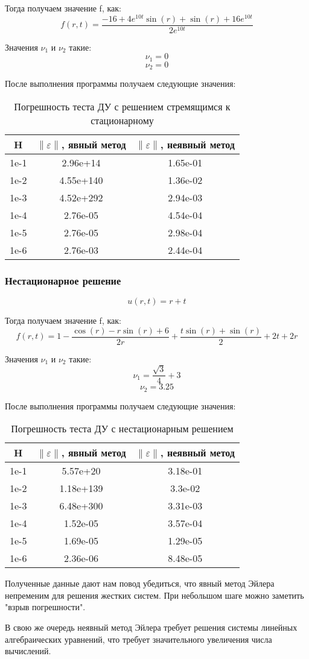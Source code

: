 Тогда получаем значение f, как:
\[
  f(r, t) = \frac{-16 + 4e^{10t}\sin(r) + \sin(r) + 16e^{10t}}{2e^{10t}}
\]

Значения $ \nu_1 $ и $ \nu_2 $ такие:
\[
  \nu_1 = 0
\]
\[
  \nu_2 = 0
\]

После выполнения программы получаем следующие значения:
\begin{table}[H]
  \centering
  \begin{tabular}{c | c | c}
    \toprule
    H & $ \left\lVert \varepsilon \right\rVert  $, явный метод & $ \left\lVert \varepsilon \right\rVert  $, неявный метод \\
    \midrule
    1e-1 & 2.96e+14 & 1.65e-01\\
    1e-2 & 4.55e+140 & 1.36e-02\\
    1e-3 & 4.52e+292 & 2.94e-03\\
    1e-4 & 2.76e-05 & 4.54e-04\\
    1e-5 & 2.76e-05 & 2.98e-04\\
    1e-6 & 2.76e-03 & 2.44e-04\\
    \bottomrule
  \end{tabular}
  \caption{Погрешность теста ДУ с решением стремящимся к стационарному}
\end{table}

\subsubsection{Нестационарное решение}
\[
  u(r, t) = r + t
\]

Тогда получаем значение f, как:
\[
  f(r, t) = 1 - \frac{\cos(r) - r\sin(r) + 6}{2r} + \frac{t\sin(r)+\sin(r)}{2} + 2t + 2r
\]

Значения $ \nu_1 $ и $ \nu_2 $ такие:
\[
  \nu_1 = \frac{\sqrt{3}}{4} + 3
\]
\[
  \nu_2 = 3.25
\]

После выполнения программы получаем следующие значения:
\begin{table}[H]
  \centering
  \begin{tabular}{c | c | c}
    \toprule
    H & $ \left\lVert \varepsilon \right\rVert  $, явный метод & $ \left\lVert \varepsilon \right\rVert  $, неявный метод \\
    \midrule
    1e-1 & 5.57e+20 & 3.18e-01\\
    1e-2 & 1.18e+139 & 3.3e-02\\
    1e-3 & 6.48e+300 & 3.31e-03\\
    1e-4 & 1.52e-05 & 3.57e-04\\
    1e-5 & 1.69e-05 & 1.29e-05\\
    1e-6 & 2.36e-06 & 8.48e-05\\
    \bottomrule
  \end{tabular}
  \caption{Погрешность теста ДУ с нестационарным решением}
\end{table}

Полученные данные дают нам повод убедиться, что явный метод Эйлера непременим для решения жестких систем.
При небольшом шаге можно заметить "взрыв погрешности". 

В свою же очередь неявный метод Эйлера требует решения системы линейных алгебраических уравнений, что требует
значительного увеличения числа вычислений.